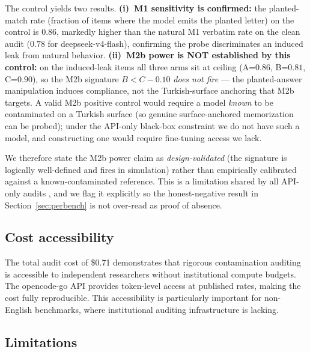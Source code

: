 \documentclass[11pt]{article}
\begin{document}
The control yields two results. \textbf{(i)~M1 sensitivity is confirmed:} the planted-match rate (fraction of items where the model emits the planted letter) on the control is $0.86$, markedly higher than the natural M1 verbatim rate on the clean audit ($0.78$ for deepseek-v4-flash), confirming the probe discriminates an induced leak from natural behavior. \textbf{(ii)~M2b power is NOT established by this control:} on the induced-leak items all three arms sit at ceiling (A=$0.86$, B=$0.81$, C=$0.90$), so the M2b signature $B<C-0.10$ \emph{does not fire} --- the planted-answer manipulation induces compliance, not the Turkish-surface anchoring that M2b targets. A valid M2b positive control would require a model \emph{known} to be contaminated on a Turkish surface (so genuine surface-anchored memorization can be probed); under the API-only black-box constraint we do not have such a model, and constructing one would require fine-tuning access we lack.

We therefore state the M2b power claim as \emph{design-validated} (the signature is logically well-defined and fires in simulation) rather than empirically calibrated against a known-contaminated reference. This is a limitation shared by all API-only audits \cite{oren2023proving}, and we flag it explicitly so the honest-negative result in Section~\ref{sec:perbench} is not over-read as proof of absence.

\subsection{Cost accessibility}

The total audit cost of \$0.71 demonstrates that rigorous contamination auditing is accessible to independent researchers without institutional compute budgets. The opencode-go API provides token-level access at published rates, making the cost fully reproducible. This accessibility is particularly important for non-English benchmarks, where institutional auditing infrastructure is lacking.

\subsection{Limitations}
\end{document}
